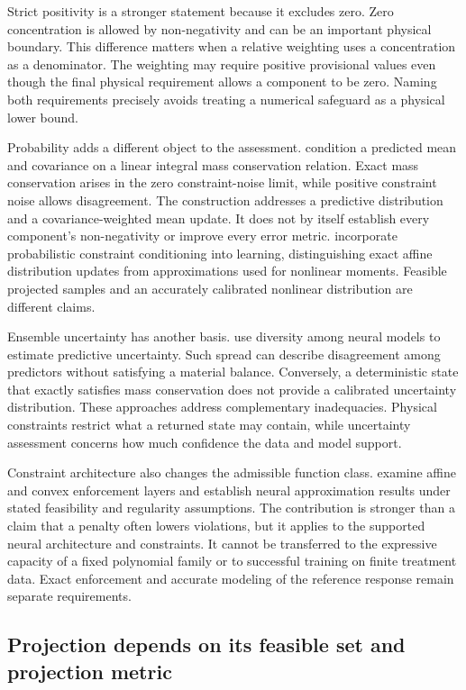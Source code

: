 Strict positivity is a stronger statement because it excludes zero. Zero concentration is allowed by non-negativity and can be an important physical boundary. This difference matters when a relative weighting uses a concentration as a denominator. The weighting may require positive provisional values even though the final physical requirement allows a component to be zero. Naming both requirements precisely avoids treating a numerical safeguard as a physical lower bound.

Probability adds a different object to the assessment. \citet{Hansen2024} condition a predicted mean and covariance on a linear integral mass conservation relation. Exact mass conservation arises in the zero constraint-noise limit, while positive constraint noise allows disagreement. The construction addresses a predictive distribution and a covariance-weighted mean update. It does not by itself establish every component's non-negativity or improve every error metric. \citet{Utkarsh2025} incorporate probabilistic constraint conditioning into learning, distinguishing exact affine distribution updates from approximations used for nonlinear moments. Feasible projected samples and an accurately calibrated nonlinear distribution are different claims.

Ensemble uncertainty has another basis. \citet{Lakshminarayanan2017} use diversity among neural models to estimate predictive uncertainty. Such spread can describe disagreement among predictors without satisfying a material balance. Conversely, a deterministic state that exactly satisfies mass conservation does not provide a calibrated uncertainty distribution. These approaches address complementary inadequacies. Physical constraints restrict what a returned state may contain, while uncertainty assessment concerns how much confidence the data and model support.

Constraint architecture also changes the admissible function class. \citet{Min2024} examine affine and convex enforcement layers and establish neural approximation results under stated feasibility and regularity assumptions. The contribution is stronger than a claim that a penalty often lowers violations, but it applies to the supported neural architecture and constraints. It cannot be transferred to the expressive capacity of a fixed polynomial family or to successful training on finite treatment data. Exact enforcement and accurate modeling of the reference response remain separate requirements.

\subsection{Projection depends on its feasible set and projection metric}

